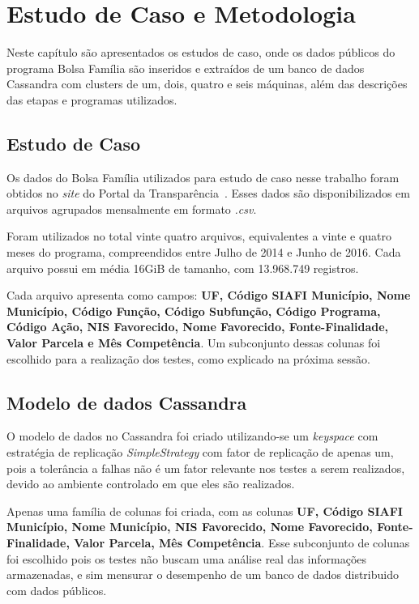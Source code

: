 

\chapter{Estudo de Caso e Metodologia}

Neste capítulo são apresentados os estudos de caso, onde os dados públicos do programa Bolsa Família são inseridos e extraídos de um banco de dados Cassandra com clusters de um, dois, quatro e seis máquinas, além das descrições das etapas e programas utilizados.

\section{Estudo de Caso}
Os dados do Bolsa Família utilizados para estudo de caso nesse trabalho foram obtidos no \emph{site} do Portal da Transparência~\cite{portaldatransparencia}. Esses dados são disponibilizados em arquivos agrupados mensalmente em formato \emph{.csv}. 

Foram utilizados no total vinte quatro arquivos, equivalentes a vinte e quatro meses do programa, compreendidos entre Julho de 2014 e Junho de 2016. Cada arquivo possui em média 16GiB de tamanho, com 13.968.749 registros.

Cada arquivo apresenta como campos: \textbf{UF, Código SIAFI Município, Nome Município, Código Função, Código Subfunção, Código Programa, Código Ação, NIS Favorecido, Nome Favorecido, Fonte-Finalidade, Valor Parcela e Mês Competência}. Um subconjunto dessas colunas foi escolhido para a realização dos testes, como explicado na próxima sessão.

\section{Modelo de dados Cassandra}
O modelo de dados no Cassandra foi criado utilizando-se um \emph{keyspace} com estratégia de replicação \emph{SimpleStrategy} com fator de replicação de apenas um, pois a tolerância a falhas não é um fator relevante nos testes a serem realizados, devido ao ambiente controlado em que eles são realizados.

Apenas uma família de colunas foi criada, com as colunas \textbf{UF, Código SIAFI Município, Nome Município, NIS Favorecido, Nome Favorecido, Fonte-Finalidade, Valor Parcela, Mês Competência}. Esse subconjunto de colunas foi escolhido pois os testes não buscam uma análise real das informações armazenadas, e sim mensurar o desempenho de um banco de dados distribuido com dados públicos.

